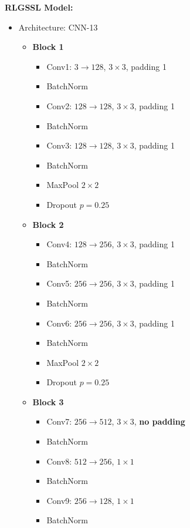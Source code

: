 \documentclass{scrartcl}
\begin{document}
\textbf{RLGSSL Model:}
\begin{itemize}
    \item Architecture: CNN-13
    \begin{itemize}
        \item \textbf{Block 1}
        \begin{itemize}
            \item Conv1: $3 \rightarrow 128$, $3{\times}3$, padding 1
            \item BatchNorm
            \item Conv2: $128 \rightarrow 128$, $3{\times}3$, padding 1
            \item BatchNorm
            \item Conv3: $128 \rightarrow 128$, $3{\times}3$, padding 1
            \item BatchNorm
            \item MaxPool $2{\times}2$
            \item Dropout $p=0.25$
        \end{itemize}

        \item \textbf{Block 2}
        \begin{itemize}
            \item Conv4: $128 \rightarrow 256$, $3{\times}3$, padding 1
            \item BatchNorm
            \item Conv5: $256 \rightarrow 256$, $3{\times}3$, padding 1
            \item BatchNorm
            \item Conv6: $256 \rightarrow 256$, $3{\times}3$, padding 1
            \item BatchNorm
            \item MaxPool $2{\times}2$
            \item Dropout $p=0.25$
        \end{itemize}

        \item \textbf{Block 3}
        \begin{itemize}
            \item Conv7: $256 \rightarrow 512$, $3{\times}3$, \textbf{no padding}
            \item BatchNorm
            \item Conv8: $512 \rightarrow 256$, $1{\times}1$
            \item BatchNorm
            \item Conv9: $256 \rightarrow 128$, $1{\times}1$
            \item BatchNorm
        \end{itemize}


\end{itemize}
\end{itemize}
\end{document}
